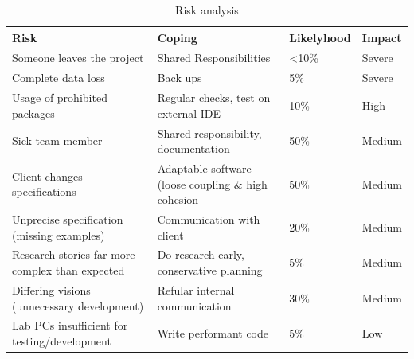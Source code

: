 \begin{table}[h]
  \caption{Risk analysis}
  \label{Risks}
  \centering
  \begin{tabular}{p{3cm}||p{5cm}|p{2cm}|p{2cm}|}
  	Risk & Coping & Likelyhood & Impact \\ 
  	\hline
  	\hline
  	Someone leaves the project & Shared Responsibilities & <10\% & Severe \\ 
  	\hline
  	Complete data loss & Back ups & 5\% & Severe \\ 
  	\hline
  	Usage of prohibited packages & Regular checks, test on external IDE & 10\% & High \\ 
  	\hline
  	Sick team member & Shared responsibility, documentation & 50\% & Medium \\ 
  	\hline
  	Client changes specifications & Adaptable software (loose coupling \& high cohesion & 50\% & Medium \\
  	\hline
  	Unprecise specification (missing examples) & Communication with client & 20\% & Medium \\ 
  	\hline
  	Research stories far more complex than expected & Do research early, conservative planning & 5\% & Medium \\ 
  	\hline
  	Differing visions (unnecessary development) & Refular internal communication & 30\% & Medium \\ 
  	\hline
  	Lab PCs insufficient for testing/development & Write performant code & 5\% & Low \\ 
  	\hline
  \end{tabular}
\end{table}